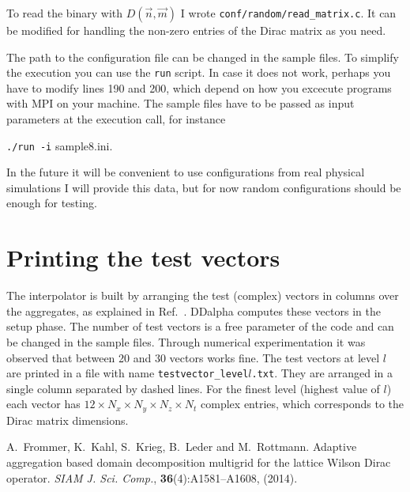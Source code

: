 \documentclass[a4paper,12pt]{scrartcl}
\begin{document}
To read the binary with $D(\vec{n},\vec{m})$ I wrote \texttt{conf/random/read\_matrix.c}. It can be modified for handling the non-zero entries of the Dirac matrix as you need.

\hspace{2mm}
 
The path to the configuration file can be changed in the sample files. To simplify the execution you can use the \texttt{run} script. In case it does not work, perhaps you have to modify lines 190 and 200, which depend on how you excecute programs with MPI on your machine. The sample files have to be passed as input parameters at the execution call, for instance \begin{center}

\texttt{./run -i} sample8.ini.                                                                                                                                                                                                                                                            \end{center}


In the future it will be convenient to use configurations from real physical simulations I will provide this data, but for now random configurations should be enough for testing.


\section{Printing the test vectors}
The interpolator is built by arranging the test (complex) vectors in columns over the aggregates, as explained in Ref.\ \cite{Frommer}. DDalpha computes these vectors in the setup phase. The number of test vectors is a free parameter of the code and can be changed in the sample files. Through numerical experimentation it was observed that between 20 and 30 vectors works fine. The test vectors at level $l$ are printed in a file with name \texttt{testvector\_level$l$.txt}. They are arranged in a single column separated by dashed lines. For the finest level (highest value of $l$) each vector has $12\times N_x\times N_y\times N_z\times N_t$ complex entries, which corresponds to the Dirac matrix dimensions.





\begin{thebibliography}{X}
A.\ Frommer, K.\ Kahl, S.\ Krieg, B.\ Leder and M.\ Rottmann. Adaptive aggregation based domain decomposition multigrid for the lattice Wilson Dirac operator. \textit{SIAM J. Sci. Comp.}, \textbf{36}(4):A1581--A1608, (2014).
\end{thebibliography}
\end{document}
